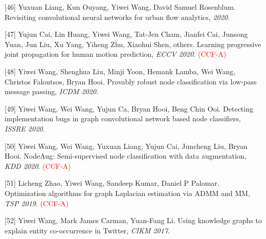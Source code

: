 [46] Yuxuan Liang, Kun Ouyang, Yiwei Wang, David Samuel Rosenblum. Revisiting convolutional neural networks for urban flow analytics, \textit{ 2020}.

[47] Yujun Cai, Lin Huang, Yiwei Wang, Tat-Jen Cham, Jianfei Cai, Junsong Yuan, Jun Liu, Xu Yang, Yiheng Zhu, Xiaohui Shen, others. Learning progressive joint propagation for human motion prediction, \textit{ECCV 2020}. \textcolor{red}{(CCF-A)}

[48] Yiwei Wang, Shenghua Liu, Minji Yoon, Hemank Lamba, Wei Wang, Christos Faloutsos, Bryan Hooi. Provably robust node classification via low-pass message passing, \textit{ICDM 2020}.

[49] Yiwei Wang, Wei Wang, Yujun Ca, Bryan Hooi, Beng Chin Ooi. Detecting implementation bugs in graph convolutional network based node classifiers, \textit{ISSRE 2020}.

[50] Yiwei Wang, Wei Wang, Yuxuan Liang, Yujun Cai, Juncheng Liu, Bryan Hooi. NodeAug: Semi-supervised node classification with data augmentation, \textit{KDD 2020}. \textcolor{red}{(CCF-A)}

[51] Licheng Zhao, Yiwei Wang, Sandeep Kumar, Daniel P Palomar. Optimization algorithms for graph Laplacian estimation via ADMM and MM, \textit{TSP 2019}. \textcolor{red}{(CCF-A)}

[52] Yiwei Wang, Mark James Carman, Yuan-Fang Li. Using knowledge graphs to explain entity co-occurrence in Twitter, \textit{CIKM 2017}.